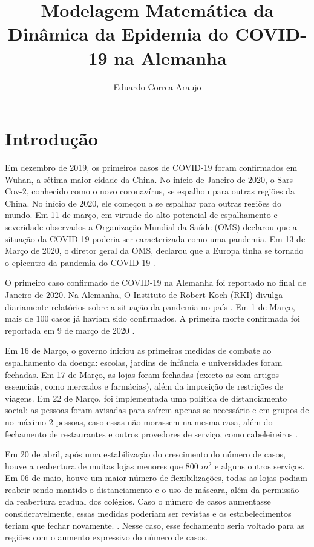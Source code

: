 \documentclass[12pt]{article}
\begin{document}
\date{}
\title{Modelagem Matemática da Dinâmica da Epidemia do COVID-19 na Alemanha}
\author{Eduardo Correa Araujo}
\maketitle
\section{Introdução}

 Em dezembro de 2019, os primeiros casos de COVID-19 foram confirmados em Wuhan, a sétima maior cidade da China. No início de Janeiro de 2020, o Sars-Cov-2, conhecido como o novo coronavírus, se espalhou para outras regiões da China. No início de 2020, ele começou a se espalhar para outras regiões do mundo. Em 11 de março, em virtude do alto potencial de espalhamento e severidade observados a Organização Mundial da Saúde (OMS) declarou que a situação da COVID-19 poderia ser caracterizada como uma pandemia. Em 13 de Março de 2020, o diretor geral da  OMS, declarou que a Europa tinha se tornado o epicentro da pandemia do COVID-19 \cite{OMS}. 

O primeiro caso confirmado de COVID-19 na Alemanha foi reportado no final de Janeiro de 2020. Na Alemanha, O Instituto de  Robert-Koch (RKI) divulga diariamente relatórios sobre a situação da pandemia no país \cite{RKI}. Em 1 de Março, mais de 100 casos já haviam sido confirmados. A primeira morte confirmada foi reportada em 9 de março de 2020 \cite{goetz2020covid}.

Em 16 de Março, o governo iniciou as primeiras medidas de combate ao espalhamento da doença: escolas, jardins de infância e universidades foram fechadas. Em 17 de Março, as lojas foram fechadas (exceto as com artigos essenciais, como mercados e farmácias), além da imposição de restrições de viagens. Em 22 de Março, foi implementada uma política de distanciamento social: as pessoas foram avisadas para saírem apenas se necessário e em grupos de no máximo 2 pessoas, caso essas não morassem na mesma casa, além do fechamento de restaurantes e outros provedores de serviço, como cabeleireiros \cite{goetz2020covid, wieland2020flatten}.

Em 20 de abril, após uma estabilização do crescimento do número de casos, houve a reabertura de muitas lojas menores que 800 $m^2$ e alguns outros serviços. Em 06 de maio, houve um maior número de flexibilizações, todas as lojas podiam reabrir sendo mantido o distanciamento e o uso de máscara, além da permissão da reabertura gradual dos colégios. Caso o número de casos aumentasse consideravelmente, essas medidas poderiam ser revistas e os estabelecimentos teriam que fechar novamente. \cite{wieland2020flatten, bbc06.05, tg06.05}. Nesse caso, esse fechamento seria voltado para as regiões com o aumento expressivo do número de casos.
\end{document}
